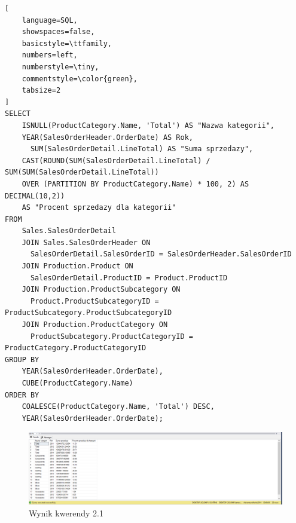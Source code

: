 \documentclass[a4paper,12pt]{article}
\begin{document}
{\small
\begin{lstlisting}[
	language=SQL,
	showspaces=false,
	basicstyle=\ttfamily,
	numbers=left,
	numberstyle=\tiny,
	commentstyle=\color{green},
	tabsize=2
]
SELECT 
    ISNULL(ProductCategory.Name, 'Total') AS "Nazwa kategorii",
    YEAR(SalesOrderHeader.OrderDate) AS Rok,
	  SUM(SalesOrderDetail.LineTotal) AS "Suma sprzedazy",
    CAST(ROUND(SUM(SalesOrderDetail.LineTotal) / SUM(SUM(SalesOrderDetail.LineTotal)) 
    OVER (PARTITION BY ProductCategory.Name) * 100, 2) AS DECIMAL(10,2)) 
    AS "Procent sprzedazy dla kategorii"
FROM 
    Sales.SalesOrderDetail
    JOIN Sales.SalesOrderHeader ON 
      SalesOrderDetail.SalesOrderID = SalesOrderHeader.SalesOrderID
    JOIN Production.Product ON 
      SalesOrderDetail.ProductID = Product.ProductID
    JOIN Production.ProductSubcategory ON 
      Product.ProductSubcategoryID = ProductSubcategory.ProductSubcategoryID
    JOIN Production.ProductCategory ON 
      ProductSubcategory.ProductCategoryID = ProductCategory.ProductCategoryID
GROUP BY 
    YEAR(SalesOrderHeader.OrderDate),
    CUBE(ProductCategory.Name)
ORDER BY 
    COALESCE(ProductCategory.Name, 'Total') DESC,
    YEAR(SalesOrderHeader.OrderDate);
\end{lstlisting}}

\begin{figure}[H]
  \centering
  \includegraphics[width=1.0\textwidth]{images/2.1.png}
  \caption{Wynik kwerendy 2.1}
\end{figure}

\subsection{}
\end{document}
